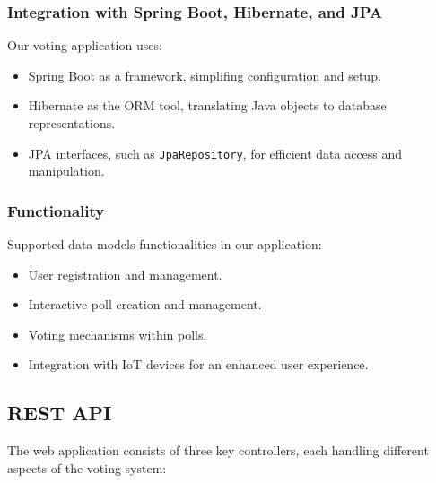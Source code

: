 \subsubsection{Integration with Spring Boot, Hibernate, and JPA}
Our voting application uses:

\begin{itemize}
    \item {Spring Boot} as a framework, simplifing configuration and setup.
    \item {Hibernate} as the ORM tool, translating Java objects to database representations.
    \item {JPA interfaces}, such as \texttt{JpaRepository}, for efficient data access and manipulation.
\end{itemize}

\subsubsection{Functionality}

Supported data models functionalities in our application:
\begin{itemize}
    \item User registration and management.
    \item Interactive poll creation and management.
    \item Voting mechanisms within polls.
    \item Integration with IoT devices for an enhanced user experience.
\end{itemize}

\subsection{REST API}
The web application consists of three key controllers, each handling different aspects of the voting system:

